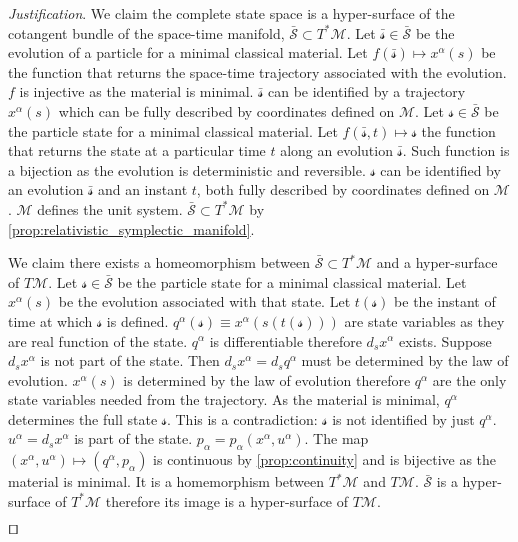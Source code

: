 \documentclass[smallextended]{svjour3}
\numberwithin{equation}{section}
\newenvironment{justification}{\emph{Justification}.}{\hfill\(\qed\)}
\begin{document}
\begin{justification}
	We claim the complete state space is a hyper-surface of the cotangent bundle of the space-time manifold, $\bar{\mathcal{S}} \subset T^*\mathcal{M}$. Let $\bar{\mathcal{s}} \in \bar{\mathcal{S}}$ be the evolution of a particle for a minimal classical material. Let $f(\bar{\mathcal{s}}) \mapsto x^\alpha(s)$ be the function that returns the space-time trajectory associated with the evolution. $f$ is injective as the material is minimal. $\bar{\mathcal{s}}$ can be identified by a trajectory $x^\alpha(s)$ which can be fully described by coordinates defined on $\mathcal{M}$. Let $\mathcal{s} \in \bar{\mathcal{S}}$ be the particle state for a minimal classical material. Let $f(\bar{\mathcal{s}}, t) \mapsto \mathcal{s}$ the function that returns the state at a particular time $t$ along an evolution $\bar{\mathcal{s}}$. Such function is a bijection as the evolution is deterministic and reversible. $\mathcal{s}$ can be identified by an evolution $\bar{\mathcal{s}}$ and an instant $t$, both fully described by coordinates defined on $\mathcal{M}$. $\mathcal{M}$ defines the unit system. $\bar{\mathcal{S}} \subset T^*\mathcal{M}$ by \ref{prop:relativistic_symplectic_manifold}.
	
	We claim there exists a homeomorphism between $\bar{\mathcal{S}} \subset T^*\mathcal{M}$ and a hyper-surface of $T\mathcal{M}$. Let $\mathcal{s} \in \bar{\mathcal{S}}$ be the particle state for a minimal classical material. Let $x^\alpha(s)$ be the evolution associated with that state. Let $t(\mathcal{s})$ be the instant of time at which $\mathcal{s}$ is defined. $q^\alpha(\mathcal{s}) \equiv x^\alpha(s(t(\mathcal{s})))$ are state variables as they are real function of the state. $q^\alpha$ is differentiable therefore $d_s x^\alpha$ exists. Suppose $d_s x^\alpha$ is not part of the state. Then $d_s x^\alpha = d_s q^\alpha$ must be determined by the law of evolution. $x^\alpha(s)$ is determined by the law of evolution therefore $q^\alpha$ are the only state variables needed from the trajectory. As the material is minimal, $q^\alpha$ determines the full state $\mathcal{s}$. This is a contradiction: $\mathcal{s}$ is not identified by just $q^\alpha$. $u^\alpha=d_s x^\alpha$ is part of the state. $p_\alpha = p_\alpha(x^\alpha, u^\alpha)$. The map $(x^\alpha, u^\alpha) \mapsto (q^\alpha, p_\alpha)$ is continuous by \ref{prop:continuity} and is bijective as the material is minimal. It is a homemorphism between $T^*\mathcal{M}$ and $T\mathcal{M}$. $\bar{\mathcal{S}}$ is a hyper-surface of $T^*\mathcal{M}$ therefore its image is a hyper-surface of $T\mathcal{M}$.
	

\end{justification}
\end{document}
